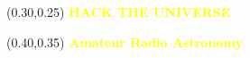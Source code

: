 \documentclass[aspectratio=169]{beamer} %
\begin{document}
\begin{frame}{}
	\setlength{\TPHorizModule}{\textwidth}
	\setlength{\TPVertModule}{\textwidth}
	\begin{textblock}{0.74}(0.30,0.25)
		\bfseries\huge\textcolor{yellow}{HACK THE UNIVERSE}
	\end{textblock}
	\begin{textblock}{0.74}(0.40,0.35)
		\bfseries\large\textcolor{yellow}{Amateur Radio Astronomy}
	\end{textblock}
\end{frame}
\end{document}
